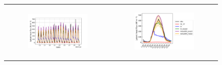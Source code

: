 \begin{figure}[hbtp]
    \centering
    \begin{tabular}{cc}
        \begin{subfigure}[t]{0.5\textwidth}
            \caption{}
            \includegraphics[width=\textwidth]{images/chap5/SOP_TS_DC/time_series_cendrosa_flat.png}
        \end{subfigure} &
        \begin{subfigure}[t]{0.5\textwidth}
            \caption{}
            \includegraphics[width=\textwidth]{images/chap5/SOP_TS_DC/diurnal_cycle_cendrosa_flat.png}
        \end{subfigure} \\
        

\end{tabular}
\end{figure}
